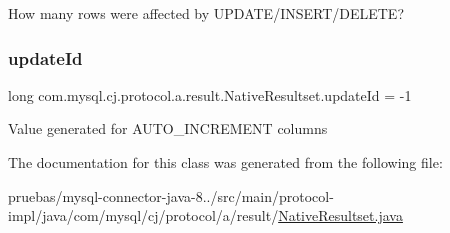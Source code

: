 How many rows were affected by U\+P\+D\+A\+T\+E/\+I\+N\+S\+E\+R\+T/\+D\+E\+L\+E\+TE? \mbox{\label{classcom_1_1mysql_1_1cj_1_1protocol_1_1a_1_1result_1_1_native_resultset_a204681a66f5f3a89ca1279af71ba4c35}} 
\subsubsection{\texorpdfstring{update\+Id}{updateId}}
{\footnotesize\ttfamily long com.\+mysql.\+cj.\+protocol.\+a.\+result.\+Native\+Resultset.\+update\+Id = -\/1\hspace{0.3cm}{\ttfamily [protected]}}

Value generated for A\+U\+T\+O\+\_\+\+I\+N\+C\+R\+E\+M\+E\+NT columns 

The documentation for this class was generated from the following file\+:\begin{DoxyCompactItemize}
\item 
pruebas/mysql-\/connector-\/java-\/8../src/main/protocol-\/impl/java/com/mysql/cj/protocol/a/result/\mbox{\hyperlink{_native_resultset_8java}{Native\+Resultset.\+java}}\end{DoxyCompactItemize}
